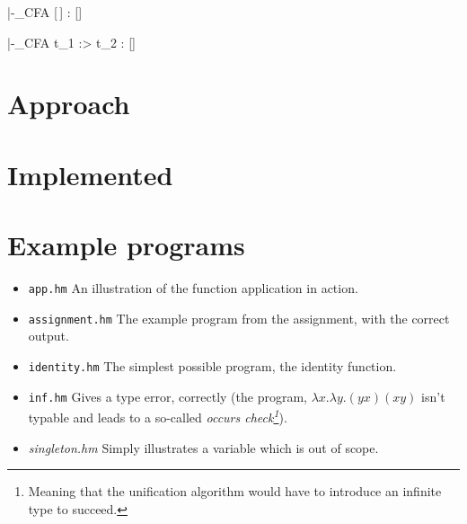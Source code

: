 \documentclass[a4paper]{article}
\begin{document}
{\widehat{\Gamma} |-_{CFA} [\,] : [\widehat{\tau}]}

{\widehat{\Gamma} |-_{CFA} t_1 \<:> t_2 :  [\widehat{\sigma}]}

\section{Approach}


\section{Implemented}

\section{Example programs}

\begin{itemize}
    \item \texttt{app.hm} An illustration of the function application in action. 
    \item \texttt{assignment.hm} The example program from the assignment, with
        the correct output. 
    \item \texttt{identity.hm} The simplest possible program, the identity
        function. 
    \item \texttt{inf.hm} Gives a type error, correctly (the program, $\lambda
        x.
        \lambda y . (y x) (x y)$ isn't typable and leads to a so-called
        \emph{occurs check\footnote{Meaning that the unification algorithm would
        have to introduce an infinite type to succeed.}}).
    \item \textit{singleton.hm} Simply illustrates a variable which is out of
        scope. 
\end{itemize}
\end{document}
